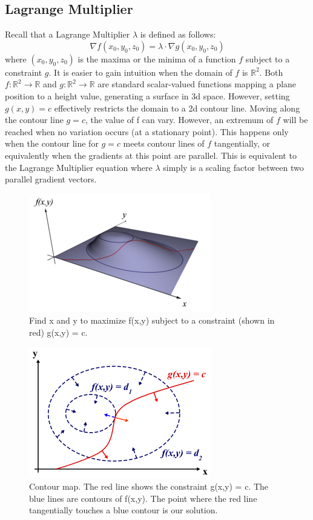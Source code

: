 \documentclass{article}
\begin{document}
\subsection{Lagrange Multiplier}
Recall that a Lagrange Multiplier $\lambda$ is defined as follows:
\begin{equation}
\nabla f(x_0, y_0, z_0) = \lambda \cdot \nabla g(x_0, y_0, z_0)
\end{equation}
where $(x_0, y_0, z_0)$ is the maxima or the minima of a function $f$ subject to a constraint $g$. It is easier to gain intuition when the domain of $f$ is $\mathbb{R}^2$. Both $f : \mathbb{R}^2 \rightarrow \mathbb{R}$ and $g : \mathbb{R}^2 \rightarrow \mathbb{R}$ are standard scalar-valued functions mapping a plane position to a height value, generating a surface in 3d space. However, setting $g(x,y)=c$ effectively restricts the domain to a 2d contour line. Moving along the contour line $g=c$, the value of f can vary. However, an extremum of $f$ will be reached when no variation occurs (at a stationary point). This happens only when the contour line for $g=c$ meets contour lines of $f$ tangentially, or equivalently when the gradients at this point are parallel. This is equivalent to the Lagrange Multiplier equation where $\lambda$ simply is a scaling factor between two parallel gradient vectors.
\begin{figure}[H]
    \centering
    \includegraphics[scale=0.7]{LagrangeMultipliers3D.png}
    \caption{Find x and y to maximize f(x,y) subject to a constraint (shown in red) g(x,y) = c.}
\end{figure}
\begin{figure}[H]
    \centering
    \includegraphics[scale=0.6]{LagrangeMultipliers2D.png}
    \caption{Contour map. The red line shows the constraint g(x,y) = c. The blue lines are contours of f(x,y). The point where the red line tangentially touches a blue contour is our solution.}
\end{figure}
\end{document}
